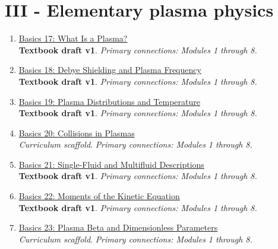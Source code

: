 \documentclass[11pt]{article}
\begin{document}
\section{III - Elementary plasma physics}
\begin{enumerate}[leftmargin=2.4em]
\item[\textbf{17.}] \href{run:basics_17_what_is_a_plasma.pdf}{Basics 17: What Is a Plasma?}\\[-0.2em]
\textbf{Textbook draft v1}. \textit{Primary connections: Modules 1 through 8.}
\item[\textbf{18.}] \href{run:basics_18_debye_shielding_and_plasma_frequency.pdf}{Basics 18: Debye Shielding and Plasma Frequency}\\[-0.2em]
\textbf{Textbook draft v1}. \textit{Primary connections: Modules 1 through 8.}
\item[\textbf{19.}] \href{run:basics_19_plasma_distributions_and_temperature.pdf}{Basics 19: Plasma Distributions and Temperature}\\[-0.2em]
\textbf{Textbook draft v1}. \textit{Primary connections: Modules 1 through 8.}
\item[\textbf{20.}] \href{run:basics_20_collisions_in_plasmas.pdf}{Basics 20: Collisions in Plasmas}\\[-0.2em]
\textit{Curriculum scaffold}. \textit{Primary connections: Modules 1 through 8.}
\item[\textbf{21.}] \href{run:basics_21_single_fluid_and_multifluid_descriptions.pdf}{Basics 21: Single-Fluid and Multifluid Descriptions}\\[-0.2em]
\textbf{Textbook draft v1}. \textit{Primary connections: Modules 1 through 8.}
\item[\textbf{22.}] \href{run:basics_22_moments_of_the_kinetic_equation.pdf}{Basics 22: Moments of the Kinetic Equation}\\[-0.2em]
\textbf{Textbook draft v1}. \textit{Primary connections: Modules 1 through 8.}
\item[\textbf{23.}] \href{run:basics_23_plasma_beta_and_dimensionless_parameters.pdf}{Basics 23: Plasma Beta and Dimensionless Parameters}\\[-0.2em]
\textit{Curriculum scaffold}. \textit{Primary connections: Modules 1 through 8.}
\end{enumerate}
\end{document}
